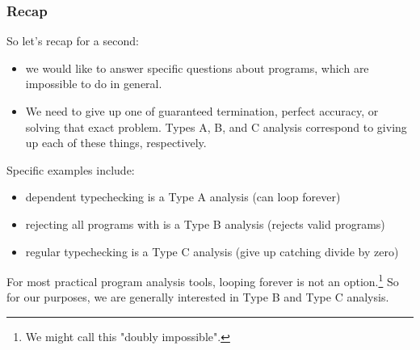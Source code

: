 \documentclass[aspectratio=169, handout]{beamer}
\begin{document}
\begin{frame}[fragile]
  \frametitle{Recap}

  So let's recap for a second:
  \pause
  \begin{itemize}
    \item we would like to answer specific questions about programs, which are
    impossible to do in general. \pause
    \item We need to give up one of guaranteed termination, perfect accuracy,
    or solving that exact problem. Types A, B, and C analysis correspond to
    giving up each of these things, respectively.
  \end{itemize}

  \pause
  \vspace{\fill}

  Specific examples include:
  \begin{itemize}
    \item dependent typechecking is a Type A analysis (can loop forever) \pause
    \item rejecting all programs with  is a Type B analysis (rejects valid programs) \pause
    \item regular typechecking is a Type C analysis (give up catching divide by zero)
  \end{itemize}

  \pause
  \vspace{\fill}

  For most practical program analysis tools, looping forever is not an option.\footnote{We
  might call this "doubly impossible".} So for our purposes, we are generally
  interested in Type B and Type C analysis.
\end{frame}
\end{document}
